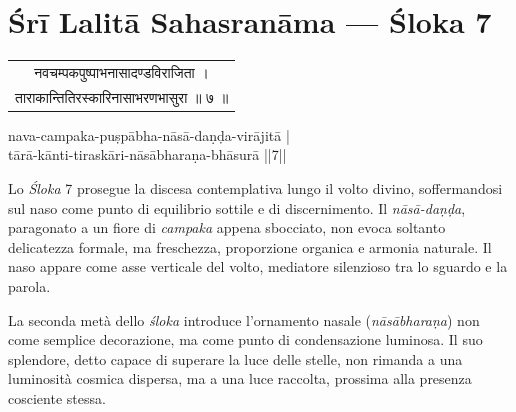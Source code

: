 \chapter*{Śrī Lalitā Sahasranāma — Śloka 7}

\begin{sloka}
{\sanskritfont
\begin{tabular}{c}
नवचम्पकपुष्पाभनासादण्डविराजिता ।\\
ताराकान्तितिरस्कारिनासाभरणभासुरा ॥ ७ ॥
\end{tabular}

\vspace{1.5em}

{\middlesize \iastfont
nava-campaka-puṣpābha-nāsā-daṇḍa-virājitā |\\
tārā-kānti-tiraskāri-nāsābharaṇa-bhāsurā ||7||}

\vspace{1em}

{\middlesize
{}
}

\middlesize \iastfont {}

}
\end{sloka}


Lo \textit{Śloka} 7 prosegue la discesa contemplativa lungo il volto divino, soffermandosi sul naso come punto di equilibrio sottile e di discernimento. Il \textit{nāsā-daṇḍa}, paragonato a un fiore di \textit{campaka} appena sbocciato, non evoca soltanto delicatezza formale, ma freschezza, proporzione organica e armonia naturale. Il naso appare come asse verticale del volto, mediatore silenzioso tra lo sguardo e la parola.

La seconda metà dello \textit{śloka} introduce l’ornamento nasale (\textit{nāsābharaṇa}) non come semplice decorazione, ma come punto di condensazione luminosa. Il suo splendore, detto capace di superare la luce delle stelle, non rimanda a una luminosità cosmica dispersa, ma a una luce raccolta, prossima alla presenza cosciente stessa.


